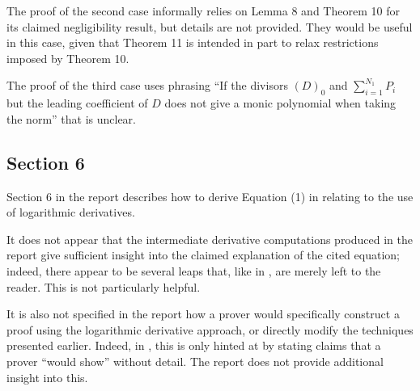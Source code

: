 \documentclass{article}
\begin{document}
The proof of the second case informally relies on Lemma 8 and Theorem 10 for its claimed negligibility result, but details are not provided.
They would be useful in this case, given that Theorem 11 is intended in part to relax restrictions imposed by Theorem 10.

The proof of the third case uses phrasing ``If the divisors $(D)_0$ and $\sum_{i=1}^{N_1} P_i$ but the leading coefficient of $D$ does not give a monic polynomial when taking the norm'' that is unclear.


\subsection{Section 6}

Section 6 in the report describes how to derive Equation (1) in \cite{ecip} relating to the use of logarithmic derivatives.

It does not appear that the intermediate derivative computations produced in the report give sufficient insight into the claimed explanation of the cited equation; indeed, there appear to be several leaps that, like in \cite{ecip}, are merely left to the reader.
This is not particularly helpful.

It is also not specified in the report how a prover would specifically construct a proof using the logarithmic derivative approach, or directly modify the techniques presented earlier.
Indeed, in \cite{ecip}, this is only hinted at by stating claims that a prover ``would show'' without detail.
The report does not provide additional insight into this.




\end{document}

